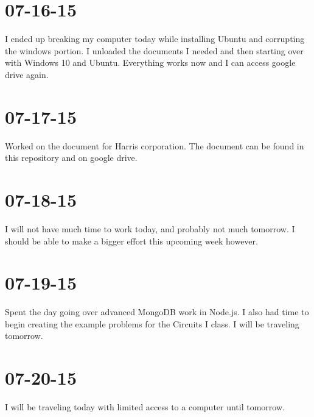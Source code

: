 \documentclass{article}
\begin{document}
	\section{07-16-15}
	I ended up breaking my computer today while installing Ubuntu and corrupting the windows portion. I unloaded
	the documents I needed and then starting over with Windows 10 and Ubuntu. Everything works now and I can access
	google drive again.
	
	\section{07-17-15}
	Worked on the document for Harris corporation. The document can be found in this repository and on google drive.

	\section{07-18-15}
	I will not have much time to work today, and probably not much tomorrow. I should be able to make a bigger effort
	this upcoming week however. 	
	
	\section{07-19-15}
	Spent the day going over advanced MongoDB work in Node.js. I also had time to begin creating the example problems
	for the Circuits I class. I will be traveling tomorrow.

	\section{07-20-15}
	I will be traveling today with limited access to a computer until tomorrow. 
\end{document}
